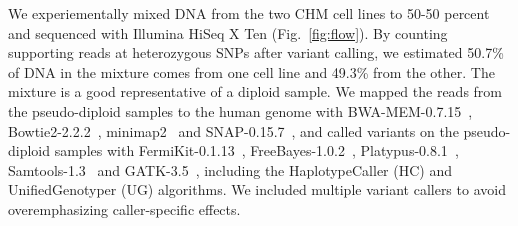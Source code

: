 \documentclass{bioinfo}
\begin{document}
We experiementally mixed DNA from the two CHM cell lines to 50-50 percent and
sequenced with Illumina HiSeq X Ten (Fig.~\ref{fig:flow}). By counting supporting
reads at heterozygous SNPs after variant calling, we estimated 50.7\% of DNA in
the mixture comes from one cell line and 49.3\% from the other. The mixture is
a good representative of a diploid sample. We mapped the reads from the
pseudo-diploid samples to the human genome with BWA-MEM-0.7.15~\citep{Li:2013aa},
Bowtie2-2.2.2~\citep{Langmead:2012fk}, minimap2~\citep{Li:2017kk} and SNAP-0.15.7~\citep{Bolosky:2014aa}, and called variants on the pseudo-diploid
samples with FermiKit-0.1.13~\citep{Li:2015eu},
FreeBayes-1.0.2~\citep{Garrison:2012aa}, Platypus-0.8.1~\citep{Rimmer:2014ab},
Samtools-1.3~\citep{Li:2011ab} and GATK-3.5~\citep{Depristo:2011vn}, including
the HaplotypeCaller (HC) and UnifiedGenotyper (UG) algorithms. We included
multiple variant callers to avoid overemphasizing caller-specific
effects.
\end{document}
